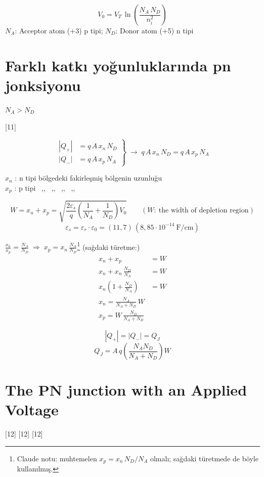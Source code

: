 \documentclass[11pt,a4paper]{article}
\begin{document}
\[ V_0 = V_T\,\ln\!\left(\frac{N_A\,N_D}{n_i^2}\right) \]
$N_A$: Acceptor atom (+3) p tipi; \quad $N_D$: Donor atom (+5) n tipi

\section{Farklı katkı yoğunluklarında pn jonksiyonu}
\noindent $N_A > N_D$

[11]

\[ \left.\begin{aligned} |Q_+| &= q\,A\,x_n\,N_D \\ |Q_-| &= q\,A\,x_p\,N_A \end{aligned}\right\}\;\rightarrow\; q\,A\,x_n\,N_D = q\,A\,x_p\,N_A \]

\noindent $x_n$ : n tipi bölgedeki fakirleşmiş bölgenin uzunluğu\\
$x_p$ : p tipi \ ,, \ ,, \ ,, \ ,,

\[ W = x_n + x_p = \sqrt{\frac{2\varepsilon_s}{q}\left(\frac{1}{N_A}+\frac{1}{N_D}\right)V_0} \qquad (W:\ \text{the width of depletion region}) \]
\[ \varepsilon_s = \varepsilon_r\cdot\varepsilon_0 = (11{,}7)\,(8{,}85\cdot10^{-14}\ \mathrm{F/cm}) \]

\noindent $\displaystyle \frac{x_n}{x_p} = \frac{N_A}{N_D} \;\Rightarrow\; x_p = x_n\,\frac{N_A}{N_D}$\footnote{Claude notu: muhtemelen $x_p = x_n\,N_D/N_A$ olmalı; sağdaki türetmede de böyle kullanılmış.}
\hfill (sağdaki türetme:)
\begin{align*}
  x_n + x_p &= W \\
  x_n + x_n\,\frac{N_D}{N_A} &= W \\
  x_n\left(1 + \frac{N_D}{N_A}\right) &= W \\
  \boxed{x_n = \frac{N_A}{N_A + N_D}\,W} & \\
  \boxed{x_p = W\,\frac{N_D}{N_A + N_D}} &
\end{align*}

\[ |Q_+| = |Q_-| = Q_J \]
\[ Q_J = A\,q\left(\frac{N_A N_D}{N_A + N_D}\right)W \]

\section{The PN junction with an Applied Voltage}
[12]
[12]
[12]
\end{document}
